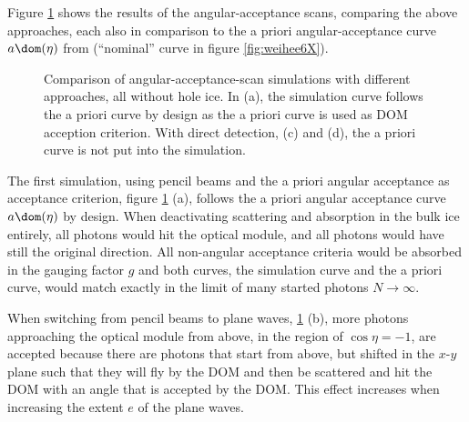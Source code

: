 Figure \ref{fig:Shai8yah} shows the results of the angular-acceptance scans, comparing the above approaches, each also in comparison to the a priori angular-acceptance curve $a\dom(\eta)$ from \cite{icepaper} (``nominal'' curve in figure \ref{fig:weihee6X}).

\begin{figure}[htbp]
  \hfill
  \hfill
  \hfill
  \caption{Comparison of angular-acceptance-scan simulations with different approaches, all without hole ice. In (a), the simulation curve follows the a priori curve by design as the a priori curve is used as DOM acception criterion. With direct detection, (c) and (d), the a priori curve is not put into the simulation.}
  \label{fig:Shai8yah}
\end{figure}

The first simulation, using pencil beams and the a priori angular acceptance as acceptance criterion, figure \ref{fig:Shai8yah} (a), follows the a priori angular acceptance curve $a\dom(\eta)$ by design. When deactivating scattering and absorption in the bulk ice entirely, all photons would hit the optical module, and all photons would have still the original direction. All non-angular acceptance criteria would be absorbed in the gauging factor $g$ and both curves, the simulation curve and the a priori curve, would match exactly in the limit of many started photons $N\rightarrow\infty$.

When switching from pencil beams to plane waves, \ref{fig:Shai8yah} (b), more photons approaching the optical module from above, in the region of $\cos \eta = -1$, are accepted because there are photons that start from above, but shifted in the $x$-$y$ plane such that they will fly by the DOM and then be scattered and hit the DOM with an angle that is accepted by the DOM. This effect increases when increasing the extent $e$ of the plane waves.


